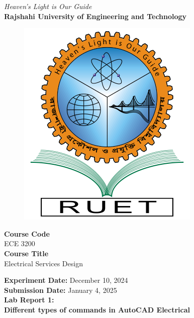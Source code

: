 \vspace*{\fill}
\begin{center}

    \emph{Heaven's Light is Our Guide} \\
    \textbf{Rajshahi University of Engineering and Technology} \\

    \begin{figure}[H]
        \centering
        \includegraphics[scale=.34]{images/RUET_logo.png}
        \label{fig:ruet_logo}
    \end{figure}
    \vspace{5mm}

    \textbf{Course Code}\\
    ECE 3200\\
    \vspace{3mm}
    \textbf{Course Title}\\
    Electrical Services Design

    \vspace{5mm}
    \textbf{Experiment Date:} {December 10, 2024}\\
    \textbf{Submission Date:} {January 4, 2025}\\

    \vspace{5mm}
    \textbf{Lab Report 1: \\ Different types of commands in AutoCAD Electrical}

    \vspace{15mm}


\end{center}
